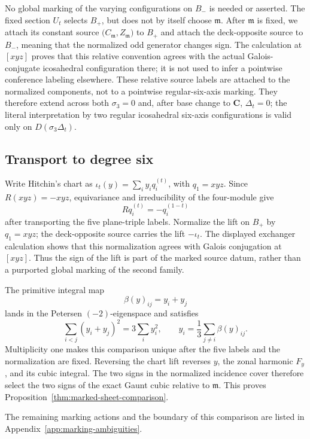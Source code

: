 No global marking of the varying configurations on \(B_-\) is needed or
asserted.  The fixed section \(U_t\) selects \(B_+\), but does not by itself
choose \(\mathfrak m\).  After \(\mathfrak m\) is fixed, we attach its
constant source \(\bigl(C_{\mathfrak m},Z_{\mathfrak m}\bigr)\) to \(B_+\)
and attach the deck-opposite source to \(B_-\), meaning that the normalized
odd generator changes sign.  The calculation at \([xyz]\) proves that this
relative convention agrees with the actual Galois-conjugate icosahedral configuration
there; it is not used to infer a pointwise conference labeling elsewhere.
These relative source labels are attached to the normalized components, not
to a pointwise regular-six-axis marking.  They therefore extend across both
\(\sigma_3=0\) and, after base change to \(\mathbf C\), \(\Delta_t=0\); the
literal interpretation by two regular icosahedral six-axis configurations is
valid only on \(D(\sigma_3\Delta_t)\).

\subsection{Transport to degree six}

Write Hitchin's chart as
\(\iota_t(y)=\sum_i y_iq_i^{(t)}\), with \(q_1=xyz\).  Since
\(R(xyz)=-xyz\), equivariance and irreducibility of the four-module give
\[
 Rq_i^{(t)}=-q_i^{(1-t)}
\]
after transporting the five plane-triple labels.  Normalize the lift on
\(B_+\) by \(q_1=xyz\); the deck-opposite source carries the lift
\(-\iota_t\).  The displayed exchanger calculation shows that this
normalization agrees with Galois conjugation at \([xyz]\).  Thus the sign of
the lift is part of the marked source datum, rather than a purported global marking
of the second family.

The primitive integral map
\[
 \beta(y)_{ij}=y_i+y_j
\]
lands in the Petersen \((-2)\)-eigenspace and satisfies
\[
 \sum_{i<j}(y_i+y_j)^2=3\sum_i y_i^2,
 \qquad
 y_i=\frac13\sum_{j\ne i}\beta(y)_{ij}.
\]
Multiplicity one makes this comparison unique after the five labels and the
normalization are fixed.  Reversing the chart lift reverses \(y\), the zonal harmonic
\(F_y\), and its cubic integral.  The two signs in the normalized incidence
cover therefore select the two signs of the exact Gaunt cubic relative to
\(\mathfrak m\).  This proves Proposition~\ref{thm:marked-sheet-comparison}.

The remaining marking actions and the boundary of this comparison are listed
in Appendix~\ref{app:marking-ambiguities}.
